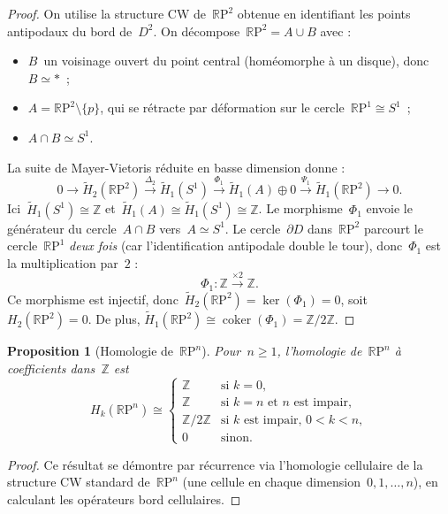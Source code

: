 \documentclass[12pt,a4paper,openany]{book}
\theoremstyle{definition}
\theoremstyle{plain}
\newtheorem{proposition}[definition]{Proposition}
\theoremstyle{remark}
\newcommand{\Z}{\mathbb{Z}}
\newcommand{\RP}{\mathbb{R}\mathrm{P}}
\DeclareMathOperator{\coker}{coker}
\begin{document}
\begin{proof}
On utilise la structure CW de~$\RP^2$ obtenue en identifiant les
points antipodaux du bord de~$D^2$. On décompose~$\RP^2 = A \cup B$ avec :
\begin{itemize}
  \item $B$~un voisinage ouvert du point central (homéomorphe à un disque),
    donc~$B \simeq \ast$~;
  \item $A = \RP^2 \setminus \{p\}$, qui se rétracte par déformation sur le
    cercle~$\RP^1 \cong S^1$~;
  \item $A \cap B \simeq S^1$.
\end{itemize}

La suite de Mayer-Vietoris réduite en basse dimension donne :
\[
  0 \to \widetilde{H}_2(\RP^2) \xrightarrow{\Delta_2} \widetilde{H}_1(S^1)
  \xrightarrow{\Phi_1} \widetilde{H}_1(A) \oplus 0
  \xrightarrow{\Psi_1} \widetilde{H}_1(\RP^2) \to 0.
\]
Ici~$\widetilde{H}_1(S^1) \cong \Z$ et~$\widetilde{H}_1(A) \cong \widetilde{H}_1(S^1) \cong \Z$.
Le morphisme~$\Phi_1$ envoie le générateur du cercle~$A \cap B$ vers~$A \simeq S^1$.
Le cercle~$\partial D$ dans~$\RP^2$ parcourt le cercle~$\RP^1$ \emph{deux fois}
(car l'identification antipodale double le tour), donc~$\Phi_1$ est la
multiplication par~$2$ :
\[
  \Phi_1 \colon \Z \xrightarrow{\times 2} \Z.
\]
Ce morphisme est injectif, donc~$\widetilde{H}_2(\RP^2) = \ker(\Phi_1) = 0$,
soit~$H_2(\RP^2) = 0$. De plus,
$\widetilde{H}_1(\RP^2) \cong \coker(\Phi_1) = \Z/2\Z$.
\end{proof}

\begin{proposition}[Homologie de~$\RP^n$]\label{prop:homologie-rpn}
\index{$\RP^n$!homologie}
Pour~$n \geqslant 1$, l'homologie de~$\RP^n$ à coefficients dans~$\Z$ est
\[
  H_k(\RP^n) \cong
  \begin{cases}
    \Z       & \text{si } k = 0,\\
    \Z       & \text{si } k = n \text{ et } n \text{ est impair},\\
    \Z/2\Z   & \text{si } k \text{ est impair, } 0 < k < n,\\
    0        & \text{sinon.}
  \end{cases}
\]
\end{proposition}

\begin{proof}
Ce résultat se démontre par récurrence via l'homologie cellulaire
de la structure CW standard de~$\RP^n$ (une cellule en chaque dimension~$0, 1, \ldots, n$),
en calculant les opérateurs bord cellulaires.
\end{proof}
\end{document}
